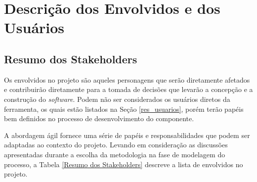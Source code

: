 \newpage
  \section{Descrição dos Envolvidos e dos Usuários}
    \subsection{Resumo dos Stakeholders}
Os envolvidos no projeto são aqueles personagens que serão diretamente afetados e contribuirão diretamente para a tomada de decisões que levarão a concepção e a construção do \textit{software}. Podem não ser considerados os usuários diretos da ferramenta, os quais estão listados na Seção \ref{res_usuarios}, porém terão papéis bem definidos no processo de desenvolvimento do componente.

A abordagem ágil fornece uma série de papéis e responsabilidades que podem ser adaptadas ao contexto do projeto. Levando em consideração as discussões apresentadas durante a escolha da metodologia na fase de modelagem do processo, a Tabela \ref{Resumo dos Stakeholders} descreve a lista de envolvidos no projeto.

